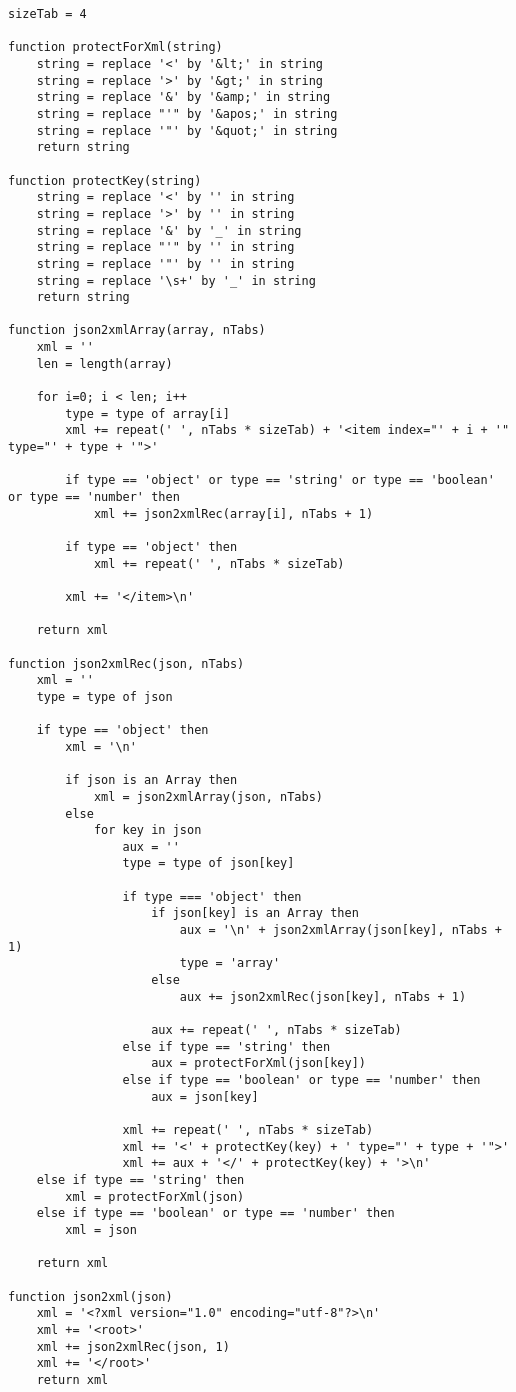 \begin{lstlisting}[language=pseudocode, caption=Algorítmo de conversão de \acrshort{json} para \acrshort{xml}]
sizeTab = 4

function protectForXml(string)
    string = replace '<' by '&lt;' in string
    string = replace '>' by '&gt;' in string
    string = replace '&' by '&amp;' in string
    string = replace "'" by '&apos;' in string
    string = replace '"' by '&quot;' in string
    return string

function protectKey(string)
    string = replace '<' by '' in string
    string = replace '>' by '' in string
    string = replace '&' by '_' in string
    string = replace "'" by '' in string
    string = replace '"' by '' in string
    string = replace '\s+' by '_' in string
    return string

function json2xmlArray(array, nTabs)
    xml = ''
    len = length(array)

    for i=0; i < len; i++
        type = type of array[i]
        xml += repeat(' ', nTabs * sizeTab) + '<item index="' + i + '" type="' + type + '">' 

        if type == 'object' or type == 'string' or type == 'boolean' or type == 'number' then
            xml += json2xmlRec(array[i], nTabs + 1)

        if type == 'object' then
            xml += repeat(' ', nTabs * sizeTab)

        xml += '</item>\n'

    return xml

function json2xmlRec(json, nTabs)
    xml = ''
    type = type of json
    
    if type == 'object' then
        xml = '\n'

        if json is an Array then
            xml = json2xmlArray(json, nTabs)
        else
            for key in json
                aux = ''
                type = type of json[key]

                if type === 'object' then
                    if json[key] is an Array then
                        aux = '\n' + json2xmlArray(json[key], nTabs + 1)
                        type = 'array'
                    else
                        aux += json2xmlRec(json[key], nTabs + 1)
                    
                    aux += repeat(' ', nTabs * sizeTab)
                else if type == 'string' then
                    aux = protectForXml(json[key])
                else if type == 'boolean' or type == 'number' then
                    aux = json[key]

                xml += repeat(' ', nTabs * sizeTab)
                xml += '<' + protectKey(key) + ' type="' + type + '">'
                xml += aux + '</' + protectKey(key) + '>\n'
    else if type == 'string' then
        xml = protectForXml(json)
    else if type == 'boolean' or type == 'number' then
        xml = json

    return xml

function json2xml(json)
    xml = '<?xml version="1.0" encoding="utf-8"?>\n'
    xml += '<root>'
    xml += json2xmlRec(json, 1)
    xml += '</root>'
    return xml
\end{lstlisting}

